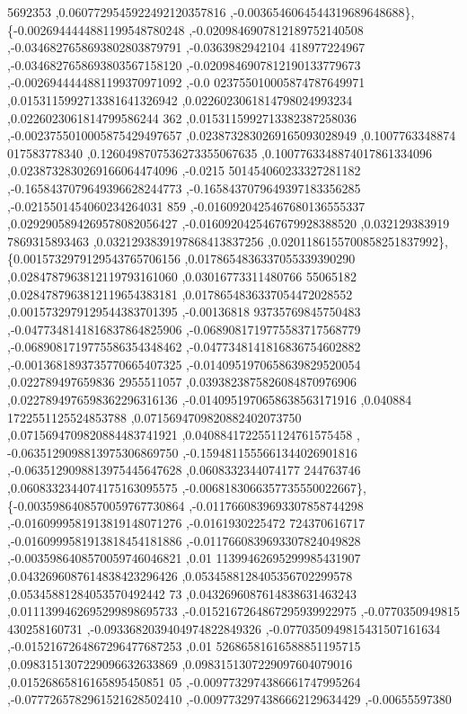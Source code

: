 \begin{DoxyCode}
      5692353 ,0.0607729545922492120357816 ,-0.0036546064544319689648688\},
\{-0.0026944444881199548780248 ,-0.0209846907812189752140508 ,-0.0346827658693802803879791 ,-0.0363982942104
      418977224967 ,-0.0346827658693803567158120 ,-0.0209846907812190133779673 ,-0.0026944444881199370971092 ,-0.0
      023755010005874787649971 ,0.0153115992713381641326942 ,0.0226023061814798024993234 ,0.0226023061814799586244
      362 ,0.0153115992713382387258036 ,-0.0023755010005875429497657 ,0.0238732830269165093028949 ,0.1007763348874
      017583778340 ,0.1260498707536273355067635 ,0.1007763348874017861334096 ,0.0238732830269166064474096 ,-0.0215
      501454060233327281182 ,-0.1658437079649396628244773 ,-0.1658437079649397183356285 ,-0.0215501454060234264031
      859 ,-0.0160920425467680136555337 ,0.0292905894269578082056427 ,-0.0160920425467679928388520 ,0.032129383919
      7869315893463 ,0.0321293839197868413837256 ,0.0201186155700858251837992\},
\{0.0015732979129543765706156 ,0.0178654836337055339390290 ,0.0284787963812119793161060 ,0.03016773311480766
      55065182 ,0.0284787963812119654383181 ,0.0178654836337054472028552 ,0.0015732979129544383701395 ,-0.00136818
      93735769845750483 ,-0.0477348141816837864825906 ,-0.0689081719775583717568779 ,-0.0689081719775586354348462 
      ,-0.0477348141816836754602882 ,-0.0013681893735770665407325 ,-0.0140951970658639829520054 ,0.022789497659836
      2955511057 ,0.0393823875826084870976906 ,0.0227894976598362296316136 ,-0.0140951970658638563171916 ,0.040884
      1722551125524853788 ,0.0715694709820882402073750 ,0.0715694709820884483741921 ,0.0408841722551124761575458 ,
      -0.0635129098813975306869750 ,-0.1594811555661344026901816 ,-0.0635129098813975445647628 ,0.0608332344074177
      244763746 ,0.0608332344074175163095575 ,-0.0068183066357735550022667\},
\{-0.0035986408570059767730864 ,-0.0117660839693307858744298 ,-0.0160999581913819148071276 ,-0.0161930225472
      724370616717 ,-0.0160999581913818454181886 ,-0.0117660839693307824049828 ,-0.0035986408570059746046821 ,0.01
      11399462695299985431907 ,0.0432696087614838423296426 ,0.0534588128405356702299578 ,0.05345881284053570492442
      73 ,0.0432696087614838631463243 ,0.0111399462695299898695733 ,-0.0152167264867295939922975 ,-0.0770350949815
      430258160731 ,-0.0933682039404974822849326 ,-0.0770350949815431507161634 ,-0.0152167264867296477687253 ,0.01
      52686581616588851195715 ,0.0983151307229096632633869 ,0.0983151307229097604079016 ,0.01526865816165895450851
      05 ,-0.0097732974386661747995264 ,-0.0777265782961521628502410 ,-0.0097732974386662129634429 ,-0.00655597380

\end{DoxyCode}
